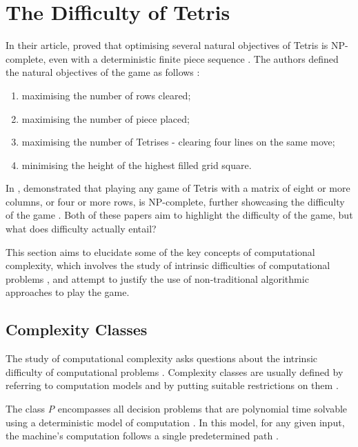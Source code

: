 \documentclass[a4paper, 12pt]{extreport}
\begin{document}
		\section{The Difficulty of Tetris} \label{sec:diff-of-tetris}
		
			In their article, \citeauthor{tetris-is-hard-even-to-approx} \cite{tetris-is-hard-even-to-approx} proved that optimising several natural objectives of Tetris is NP-complete, even with a deterministic finite piece sequence . The authors defined the natural objectives of the game as follows \cite{tetris-is-hard-even-to-approx}:
			
			\begin{enumerate}
				\item maximising the number of rows cleared;
				\item maximising the number of piece placed;
				\item maximising the number of Tetrises - clearing four lines on the same move;
				\item minimising the height of the highest filled grid square.
			\end{enumerate}
			
			In \citeyear{tetris-o1-np-hard}, \citeauthor{tetris-o1-np-hard} \cite{tetris-o1-np-hard} demonstrated that playing any game of Tetris with a matrix of eight or more columns, or four or more rows, is NP-complete, further showcasing the difficulty of the game . Both of these papers aim to highlight the difficulty of the game, but what does difficulty actually entail?
			
			This section aims to elucidate some of the key concepts of computational complexity, which involves the study of intrinsic difficulties of computational problems \cite{cc:conceptual-perspective}, and attempt to justify the use of non-traditional algorithmic approaches to play the game.
			
			\subsection{Complexity Classes}\label{subsec:compclass}
				
				The study of computational complexity asks questions about the intrinsic difficulty of computational problems \cite{cc:conceptual-perspective}. Complexity classes are usually defined by referring to computation models and by putting suitable restrictions on them \cite{uniform-cc}. 
				
				The class \textit{P} encompasses all decision problems that are polynomial time solvable using a deterministic model of computation \cite{cc:modern}. In this model, for any given input, the machine's computation follows a single predetermined path \cite{sipser-intro-to-computation}. 
				
\end{document}
